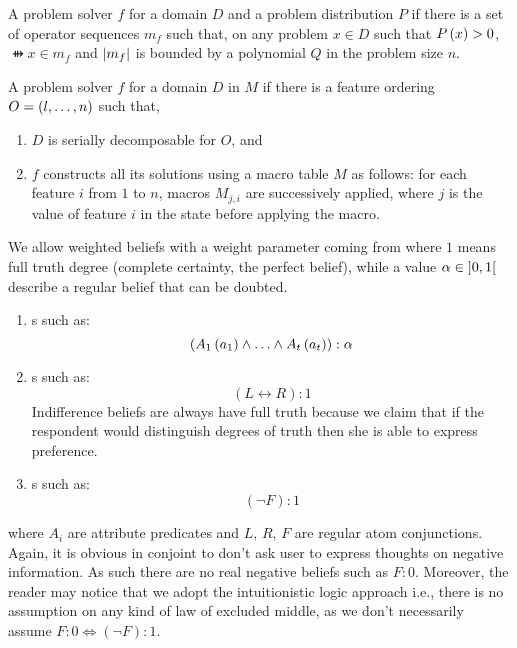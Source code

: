 \begin{defi}
A problem solver $f$ for a domain $D$ and a problem distribution $P$  if there is a set of operator sequences $m_f$ such that, on any problem $x\in D$ such that $P\left(x\right)>0$, $\ffun{x}\in m_f$ and $\left|m_f\right|$ is bounded by a polynomial $Q$ in the problem size $n$.
\cite{conf/ijcai/Tadepalli91}
\end{defi}

\begin{defi}
A problem solver $f$  for a domain $D$ in $M$ if there is a feature ordering $O=\left( l,\ldots,n\right)$ such that,
\begin{enumerate}
 \item $D$ is serially decomposable for $O$, and
 \item $f$ constructs all its solutions using a macro table $M$ as follows: for each feature $i$ from $1$ to $n$, macros $M_{j,i}$ are successively applied, where $j$ is the value of feature $i$ in the state before applying the macro.
\end{enumerate}
\cite{conf/ijcai/Tadepalli91}
\end{defi}

\begin{defi}
We allow weighted beliefs with a weight parameter coming from  where $1$ means full truth degree (complete certainty, the perfect belief), while a value $\alpha\in\left]0,1\right[$ describe a regular belief that can be doubted.
\begin{enumerate}
 \item {}s such as:
 \begin{equation}
(A_1\left(a_1\right)\wedge\ldots\wedge A_t\left(a_t\right)):\alpha
 \end{equation}
 \item {}s such as:
 \begin{equation}
 \left(L\leftrightarrow R\right):1
 \end{equation}
 Indifference beliefs are always have full truth because we claim that if the respondent would distinguish degrees of truth then she is able to express preference.
 \item {}s such as:
 \begin{equation}
 \left(\neg F\right):1
 \end{equation}
\end{enumerate}
where $A_i$ are attribute predicates and $L$, $R$, $F$ are regular atom conjunctions. Again, it is obvious in conjoint to don't ask user to express thoughts on negative information. As such there are no real negative beliefs such as $F:0$. Moreover, the reader may notice that we adopt the intuitionistic logic approach i.e., there is no assumption on any kind of law of excluded middle, as we don't necessarily assume $F:0\Leftrightarrow\left(\neg F\right):1$.
\cite{conf/fedcsis/GiurcaSB12}
\end{defi}

